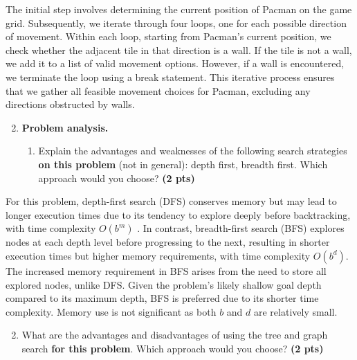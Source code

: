 \documentclass[11pt,a4paper]{../template/report}
\begin{document}
\begin{answer}
The initial step involves determining the current position of Pacman on the game grid. Subsequently, we iterate through four loops, one for each possible direction of movement. Within each loop, starting from Pacman's current position, we check whether the adjacent tile in that direction is a wall. If the tile is not a wall, we add it to a list of valid movement options. However, if a wall is encountered, we terminate the loop using a break statement. This iterative process ensures that we gather all feasible movement choices for Pacman, excluding any directions obstructed by walls.
\end{answer}



\begin{enumerate}
\setcounter{enumi}{1}
    \item \textbf{Problem analysis.}
    \begin{enumerate}
        \item Explain the advantages and weaknesses of the following search strategies \textbf{on this problem} (not in general): depth first, breadth first. Which approach would you choose? \textbf{(2 pts)}
    \end{enumerate}
\end{enumerate}

\begin{answer}
For this problem, depth-first search (DFS) conserves memory but may lead to longer execution times due to its tendency to explore deeply before backtracking, with time complexity \( O(\textit{b}^{\textit{m}}) \) . In contrast, breadth-first search (BFS) explores nodes at each depth level before progressing to the next, resulting in shorter execution times but higher memory requirements, with time complexity \( O(\textit{b}^{\textit{d}}) \). The increased memory requirement in BFS arises from the need to store all explored nodes, unlike DFS. Given the problem's likely shallow goal depth compared to its maximum depth, BFS is preferred due to its shorter time complexity. Memory use is not significant as both $b$ and $d$ are relatively small.
\end{answer}



\begin{enumerate}
\setcounter{enumi}{1}
\begin{enumerate}
\setcounter{enumii}{1}
    \item What are the advantages and disadvantages of using the tree and graph search \textbf{for this problem}. Which approach would you choose? \textbf{(2 pts)}
\end{enumerate}
\end{enumerate}
\end{document}
